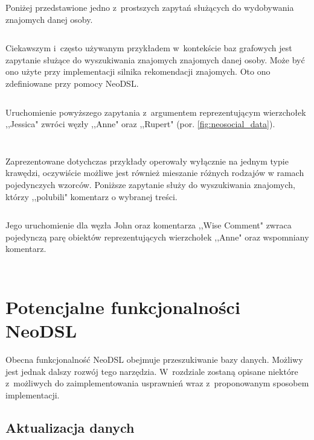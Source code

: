 \documentclass{xmgr}
\begin{document}
Poniżej przedstawione jedno z~prostszych zapytań służących do wydobywania znajomych danej osoby.

\inputminted{scala}{listings/scala/examples/socialnetwork/person-friends-query.scala}

Ciekawszym i~często używanym przykładem w~kontekście baz grafowych jest zapytanie służące do wyszukiwania znajomych znajomych danej osoby. Może być ono użyte przy implementacji silnika rekomendacji znajomych. Oto ono zdefiniowane przy pomocy NeoDSL.

\newpage

\inputminted{scala}{listings/scala/examples/socialnetwork/person-fof-query.scala}

Uruchomienie powyższego zapytania z~argumentem reprezentującym wierzchołek ,,Jessica" zwróci węzły ,,Anne" oraz ,,Rupert" (por. \ref{fig:neosocial_data}).

\inputminted{scala}{listings/scala/examples/socialnetwork/person-fof-result.scala}
\inputminted{text}{listings/text/person-fof-result.txt}

Zaprezentowane dotychczas przykłady operowały wyłącznie na jednym typie krawędzi, oczywiście możliwe jest również mieszanie różnych rodzajów w ramach pojedynczych wzorców. Poniższe zapytanie służy do wyszukiwania znajomych, którzy ,,polubili" komentarz o wybranej treści.

\inputminted{scala}{listings/scala/examples/socialnetwork/friendswholikecomment.scala}

Jego uruchomienie dla węzła John oraz komentarza ,,Wise Comment" zwraca pojedynczą parę obiektów reprezentujących wierzchołek ,,Anne" oraz wspomniany komentarz.

\inputminted{scala}{listings/scala/examples/socialnetwork/friendswholikecomment-exec.scala}
\inputminted{text}{listings/text/friendswholikecomment-result.txt}

\chapter{Potencjalne funkcjonalności NeoDSL}

Obecna funkcjonalność NeoDSL obejmuje przeszukiwanie bazy danych. Możliwy jest jednak dalszy rozwój tego narzędzia. W~rozdziale zostaną opisane niektóre z~możliwych do zaimplementowania usprawnień wraz z~proponowanym sposobem implementacji.

\section{Aktualizacja danych}
\end{document}
